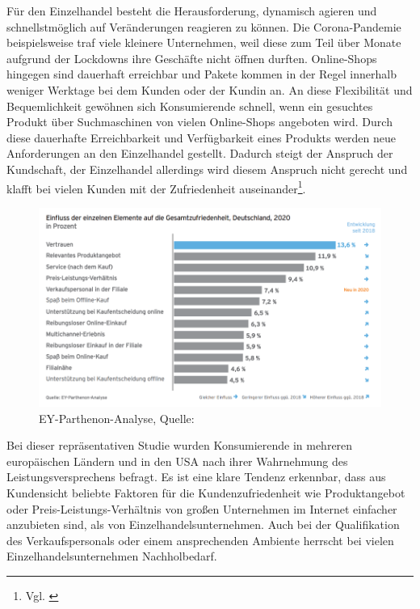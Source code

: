 Für den Einzelhandel besteht die Herausforderung, dynamisch agieren und schnellstmöglich auf Veränderungen reagieren zu können. Die Corona-Pandemie beispielsweise traf viele kleinere Unternehmen, weil diese zum Teil über Monate aufgrund der Lockdowns ihre Geschäfte nicht öffnen durften. Online-Shops hingegen sind dauerhaft erreichbar und Pakete kommen in der Regel innerhalb weniger Werktage bei dem Kunden oder der Kundin an. An diese Flexibilität und Bequemlichkeit gewöhnen sich Konsumierende schnell, wenn ein gesuchtes Produkt über Suchmaschinen von vielen Online-Shops angeboten wird. Durch diese dauerhafte Erreichbarkeit und Verfügbarkeit eines Produkts werden neue Anforderungen an den Einzelhandel gestellt. Dadurch steigt der Anspruch der Kundschaft, der Einzelhandel allerdings wird diesem Anspruch nicht gerecht und klafft bei vielen Kunden mit der Zufriedenheit auseinander\footnote{Vgl. \autocite [S.3] {Jaeger2016}}.

\begin{figure}[!ht]
    \centering
    \includegraphics[width=1\textwidth,angle=0]{src/abbildungen/gesamtzufriedenheit_verbraucher.png}
    \caption[Quelle: EY-Parthenon-Analyse, 2020]{EY-Parthenon-Analyse, Quelle: \autocite {EYParthenon2020}}
   \label{fig: Quelle: EY-Parthenon-Analyse 2020}
   \end{figure}

Bei dieser repräsentativen Studie wurden Konsumierende in mehreren europäischen Ländern und in den USA nach ihrer Wahrnehmung des Leistungsversprechens befragt.
\newline
Es ist eine klare Tendenz erkennbar, dass aus Kundensicht beliebte Faktoren für die Kundenzufriedenheit wie Produktangebot oder Preis-Leistungs-Verhältnis von großen Unternehmen im Internet einfacher anzubieten sind, als von Einzelhandelsunternehmen.
Auch bei der Qualifikation des Verkaufspersonals oder einem ansprechenden Ambiente herrscht bei vielen Einzelhandelsunternehmen Nachholbedarf.
\newline

